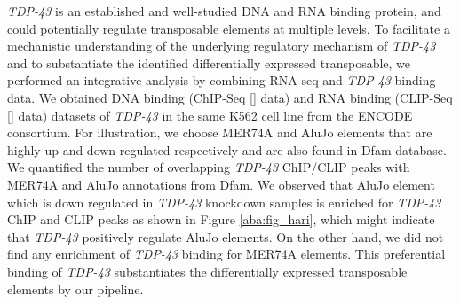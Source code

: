 \documentclass[wsdraft]{ws-procs11x85}
\begin{document}
\textit{TDP-43} is an established and well-studied DNA and RNA binding protein,
and could potentially regulate transposable elements at multiple levels.\cite{tan2016extensive} 
To facilitate a mechanistic understanding of the underlying regulatory mechanism of \textit{TDP-43} and to substantiate the identified differentially expressed transposable, we performed an integrative analysis by combining RNA-seq and \textit{TDP-43} binding data. 
We obtained DNA binding (ChIP-Seq [] data) and RNA binding (CLIP-Seq [] data)
datasets of \textit{TDP-43} in the same K562 cell line from the ENCODE consortium.
For illustration, we choose MER74A and AluJo elements that are highly up and down regulated respectively and are also found in 
Dfam database.\cite{hubley2015dfam} We quantified the number of overlapping \textit{TDP-43} ChIP/CLIP peaks with MER74A and AluJo annotations 
from Dfam. We observed that AluJo element which is down regulated in \textit{TDP-43} knockdown samples is enriched for \textit{TDP-43} 
ChIP and CLIP peaks as shown in Figure \ref{aba:fig_hari}, which might indicate that \textit{TDP-43} positively regulate AluJo elements. 
On the other hand, we did not find any enrichment of \textit{TDP-43} binding for MER74A elements. This preferential binding of \textit{TDP-43} substantiates the differentially expressed transposable elements by our pipeline. 
\end{document}
